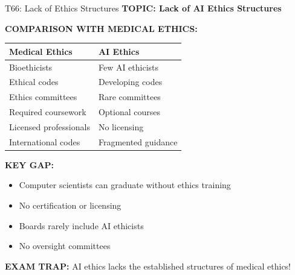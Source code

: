 \documentclass[8pt]{beamer}
\begin{document}
	\begin{frame}{T66: Lack of Ethics Structures}
		\fontsize{6.5}{7.5}\selectfont
		\textbf{TOPIC: Lack of AI Ethics Structures}
		
		\vspace{0.1cm}
		\textbf{COMPARISON WITH MEDICAL ETHICS:}
		\begin{tabular}{|p{4cm}|p{4cm}|}
			\hline
			\textbf{Medical Ethics} & \textbf{AI Ethics} \\
			\hline
			Bioethicists & Few AI ethicists \\
			Ethical codes & Developing codes \\
			Ethics committees & Rare committees \\
			Required coursework & Optional courses \\
			Licensed professionals & No licensing \\
			International codes & Fragmented guidance \\
			\hline
		\end{tabular}
		
		\vspace{0.1cm}
		\textbf{KEY GAP:}
		\begin{itemize}
			\item Computer scientists can graduate without ethics training
			\item No certification or licensing
			\item Boards rarely include AI ethicists
			\item No oversight committees
		\end{itemize}
		
		\textcolor{myred}{\textbf{EXAM TRAP:}} AI ethics lacks the \textcolor{myblue}{established structures} of medical ethics!
	\end{frame}
	
\end{document}
